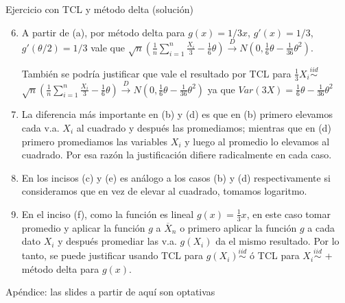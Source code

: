 \documentclass{beamer}
\theoremstyle{definition}
\begin{document}
\begin{frame}{\color{rosee}Ejercicio con TCL y método delta (solución)}\small \color{gray}
    \begin{enumerate}[label=(\alph*),leftmargin=*]
    \setcounter{enumi}{5}
    \item A partir de (a), por método delta para $g(x)=1/3x$, $g'(x)=1/3$, $g'(\theta/2)=1/3$ vale que $\sqrt{n}\left(\frac{1}{n}\sum_{i=1}^{n}\frac{X_i}{3}-\frac{1}{6}\theta \right)\stackrel{D}{\to}N\left(0,\frac{1}{6}\theta-\frac{1}{36}\theta^2\right)$.

    \vspace{4pt}

    También se podría justificar que vale el resultado por TCL para $\frac{1}{3}X_i\stackrel{iid}{\sim}$ $\sqrt{n}\left(\frac{1}{n}\sum_{i=1}^{n}\frac{X_i}{3}-\frac{1}{6}\theta \right)\stackrel{D}{\to}N\left(0,\frac{1}{6}\theta-\frac{1}{36}\theta^2\right)$ ya que $Var\left(3X\right)=\frac{1}{6}\theta-\frac{1}{36}\theta^2$
    \item La diferencia más importante en (b) y (d) es que en (b) primero elevamos cada v.a. $X_i$ al cuadrado y después las promediamos; mientras que en (d) primero promediamos las variables $X_i$ y luego al promedio lo elevamos al cuadrado. Por esa razón la justificación difiere radicalmente en cada caso.
    \item En los incisos (c) y (e) es análogo a los casos (b) y (d) respectivamente si consideramos que en vez de elevar al cuadrado, tomamos logaritmo.
    \item En el inciso (f), como la función es lineal $g(x)=\frac{1}{3}x$, en este caso tomar promedio y aplicar la función $g$ a $\overline{X}_n$ o primero aplicar la función $g$ a cada dato $X_i$ y después promediar las v.a. $g(X_i)$ da el mismo resultado. Por lo tanto, se puede justificar usando TCL para $g(X_i)\stackrel{iid}{\sim}$ \'o TCL para $X_i\stackrel{iid}{\sim}$ + método delta para $g(x)$.
    \end{enumerate}
     \end{frame}

\begin{frame}[noframenumbering]{}
    \begin{center}
        \Large Apéndice: las slides a partir de aquí son optativas
    \end{center}
\end{frame}
\end{document}
